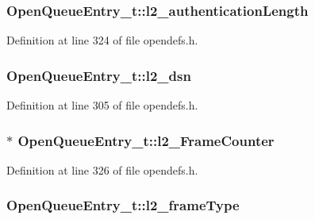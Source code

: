 \subsubsection[{\texorpdfstring{l2\+\_\+authentication\+Length}{l2_authenticationLength}}]{ Open\+Queue\+Entry\+\_\+t\+::l2\+\_\+authentication\+Length}\hypertarget{struct_open_queue_entry__t_a3d2981039675084799c67166b88d8af1}{}\label{struct_open_queue_entry__t_a3d2981039675084799c67166b88d8af1}


Definition at line 324 of file opendefs.\+h.

\subsubsection[{\texorpdfstring{l2\+\_\+dsn}{l2_dsn}}]{ Open\+Queue\+Entry\+\_\+t\+::l2\+\_\+dsn}\hypertarget{struct_open_queue_entry__t_a39e7543042b34ad3c5644c1e6efae2fd}{}\label{struct_open_queue_entry__t_a39e7543042b34ad3c5644c1e6efae2fd}


Definition at line 305 of file opendefs.\+h.

\subsubsection[{\texorpdfstring{l2\+\_\+\+Frame\+Counter}{l2_FrameCounter}}]{$\ast$ Open\+Queue\+Entry\+\_\+t\+::l2\+\_\+\+Frame\+Counter}\hypertarget{struct_open_queue_entry__t_a073671f239f8af964e8cf7316f85eed7}{}\label{struct_open_queue_entry__t_a073671f239f8af964e8cf7316f85eed7}


Definition at line 326 of file opendefs.\+h.

\subsubsection[{\texorpdfstring{l2\+\_\+frame\+Type}{l2_frameType}}]{ Open\+Queue\+Entry\+\_\+t\+::l2\+\_\+frame\+Type}\hypertarget{struct_open_queue_entry__t_a904ffa7656aa3a2cff24036bd7b1b850}{}\label{struct_open_queue_entry__t_a904ffa7656aa3a2cff24036bd7b1b850}



